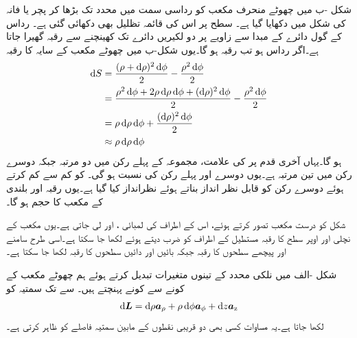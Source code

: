 شکل -ب میں چھوٹے منحرف مکعب کو رداسی سمت میں  محدد تک بڑھا کر پچر یا فانہ کی شکل میں دکھایا گیا ہے۔ سطح پر اس کی   قائمہ تظلیل بھی دکھائی گئی ہے۔ رداس کے گول دائرے  کے مبدا سے   زاویے پر دو لکیریں دائرے تک کھینچنے سے   رقبہ گھیرا جاتا ہے۔اگر رداس  ہو تب رقبہ  ہو گا۔یوں شکل-ب میں چھوٹے مکعب کے سایہ  کا رقبہ 
\begin{align*}
\dif S&=\frac{(\rho+\dif \rho)^2 \dif \phi}{2} - \frac{\rho^2 \dif \phi}{2}\\
&=\frac{\rho^2 \dif \phi +2 \rho \dif \rho \dif \phi+(\dif \rho)^2 \dif \phi}{2}-\frac{\rho^2 \dif \phi}{2}\\
&=\rho \dif \rho \dif \phi+\frac{(\dif \rho)^2 \dif \phi}{2}\\
&\approx \rho \dif \rho \dif \phi
\end{align*}
ہو گا۔یہاں آخری قدم پر  کی علامت، مجموعہ کے پہلے رکن میں دو مرتبہ  جبکہ دوسرے رکن میں تین مرتبہ ہے۔یوں دوسرے اور پہلے رکن کی نسبت
   ہو گی۔ کو کم سے کم کرتے ہوئے دوسرے رکن کو قابل نظر انداز بناتے ہوئے نظرانداز کیا گیا ہے۔یوں  رقبہ اور  بلندی کے مکعب کا حجم  ہو گا۔

شکل  کو درست مکعب تصور کرتے ہوئے، اس کے اطراف کی لمبائی ،  اور  لی جاتی ہے۔یوں مکعب کے نچلی اور اوپر سطح کا رقبہ مستطیل کے اطراف کو ضرب دیتے ہوئے   لکھا جا سکتا ہے۔اسی طرح سامنے اور پیچھے سطحوں  کا رقبہ  جبکہ بائیں اور دائیں سطحوں کا رقبہ  لکھا جا سکتا ہے۔


شکل -الف میں نلکی محدد کے تینوں متغیرات تبدیل کرتے ہوئے ہم چھوٹے مکعب کے   کونے سے  کونے پہنچتے ہیں۔ سے  تک سمتیہ کو
\begin{align}\label{مساوات_سمتیہ_نلکی_چھوٹا_فاصلہ}
\dif \kvec{L}=\dif \rho \arho+\rho \dif \phi \aphi+\dif z \az
\end{align}
لکھا جاتا ہے۔یہ مساوات کسی بھی دو قریبی نقطوں کے مابین سمتیہ فاصلے کو ظاہر کرتی ہے۔

